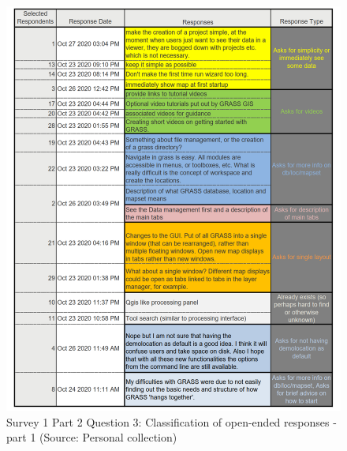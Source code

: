 \documentclass[a4paper,10pt,twoside]{article}
\begin{document}
\newpage
\vspace{0.3cm}
\begin{figure}[hbt!] 
\begin{center}
\includegraphics[width=17cm]{../surveys/analyzed_data/survey1_part2_question3_open_ended-2_2.png} 
\caption[Survey 1 Part 2 Question 3: Classification of open-ended responses - part 1]{Survey 1 Part 2 Question 3: Classification of open-ended responses - part 1 (Source: Personal collection)}
\label{fig:survey1_part2_question3_open_ended-1_1}
\end{center}
\end{figure}
\end{document}
